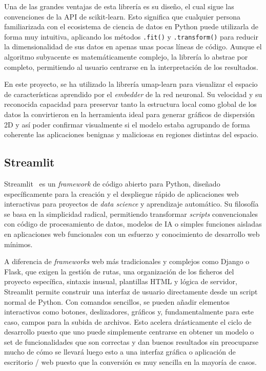 Una de las grandes ventajas de esta librería es su diseño, el cual sigue las convenciones de la API de scikit-learn. Esto significa que cualquier persona familiarizada con el ecosistema de ciencia de datos en Python puede utilizarla de forma muy intuitiva, aplicando los métodos \texttt{.fit()} y \texttt{.transform()} para reducir la dimensionalidad de sus datos en apenas unas pocas líneas de código. Aunque el algoritmo subyacente es matemáticamente complejo, la librería lo abstrae por completo, permitiendo al usuario centrarse en la interpretación de los resultados.

En este proyecto, se ha utilizado la librería umap-learn para visualizar el espacio de características aprendido por el \textit{embedder} de la red neuronal. Su velocidad y su reconocida capacidad para preservar tanto la estructura local como global de los datos la convirtieron en la herramienta ideal para generar gráficos de dispersión 2D y así poder confirmar visualmente si el modelo estaba agrupando de forma coherente las aplicaciones benignas y maliciosas en regiones distintas del espacio.

\subsection{Streamlit}


Streamlit~\cite{streamlitDocs} es un \textit{framework} de código abierto para Python, diseñado específicamente para la creación y el despliegue rápido de aplicaciones web interactivas para proyectos de \textit{data science} y aprendizaje automático. Su filosofía se basa en la simplicidad radical, permitiendo transformar \textit{scripts} convencionales con código de procesamiento de datos, modelos de IA o simples funciones aisladas en aplicaciones web funcionales con un esfuerzo y conocimiento de desarrollo web mínimos.

A diferencia de \textit{frameworks} web más tradicionales y complejos como Django o Flask, que exigen la gestión de rutas, una organización de los ficheros del proyecto específica, sintaxis inusual, plantillas HTML y lógica de servidor, Streamlit permite construir una interfaz de usuario directamente desde un script normal de Python. Con comandos sencillos, se pueden añadir elementos interactivos como botones, deslizadores, gráficos y, fundamentalmente para este caso, campos para la subida de archivos. Esto acelera drásticamente el ciclo de desarrollo puesto que uno puede simplemente centrarse en obtener un modelo o set de funcionalidades que son correctas y dan buenos resultados sin preocuparse mucho de cómo se llevará luego esto a una interfaz gráfica o aplicación de escritorio / web puesto que la conversión es muy sencilla en la mayoría de casos.

